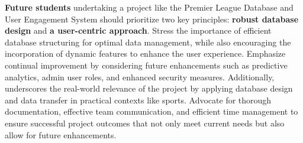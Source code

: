 \documentclass[letterpaper]{article}
\begin{document}
\textbf{Future students} undertaking a project like the Premier League Database and User Engagement System should prioritize two key principles: \textbf{robust database design }and\textbf{ a user-centric approach}. Stress the importance of efficient database structuring for optimal data management, while also encouraging the incorporation of dynamic features to enhance the user experience. Emphasize continual improvement by considering future enhancements such as predictive analytics, admin user roles, and enhanced security measures. Additionally, underscores the real-world relevance of the project by applying database design and data transfer in practical contexts like sports. Advocate for thorough documentation, effective team communication, and efficient time management to ensure successful project outcomes that not only meet current needs but also allow for future enhancements.
 
\end{document}
